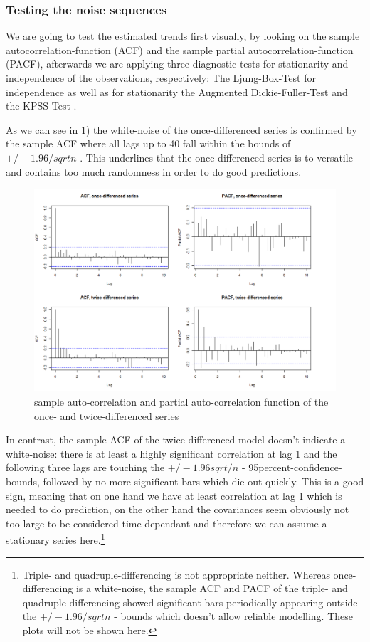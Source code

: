 \documentclass[11pt,a4paper]{article}
\begin{document}
\subsubsection{Testing the noise sequences}

We are going to test the estimated trends first visually, by looking on the sample autocorrelation-function (ACF) and the sample partial autocorrelation-function (PACF), afterwards we are applying three diagnostic tests for stationarity and independence of the observations, respectively:
The Ljung-Box-Test \citep{LjungBox78} for independence as well as for stationarity the Augmented Dickie-Fuller-Test \citep{adf} and the KPSS-Test \citep{kpss92}.

As we can see in \cref{fig:diff12_acf_pacf}) the white-noise of the once-differenced series is confirmed by the sample ACF where all lags up to 40 fall within the bounds of $+/-1.96/sqrt{n}$ \cite[p.~39]{bd02}.
This underlines that the once-differenced series is to versatile and contains too much randomness in order to do good predictions.

\begin{figure}
    \centering
    \includegraphics[angle=0,width=1\textwidth]{diff12_acf_pacf}
    \caption{sample auto-correlation and partial auto-correlation function of the once- and twice-differenced series}
    \label{fig:diff12_acf_pacf}
\end{figure}

In contrast, the sample ACF of the twice-differenced model doesn't indicate a white-noise: there is at least a highly significant correlation at lag 1 and the following three lags are touching the $+/-1.96sqrt/{n}$ - 95percent-confidence-bounds, followed by no more significant bars which die out quickly.
This is a good sign, meaning that on one hand we have at least correlation at lag 1 which is needed to do prediction, on the other hand the covariances seem obviously not too large to be considered time-dependant and therefore we can assume a stationary series here.\footnote{
    Triple- and quadruple-differencing is not appropriate neither.
    Whereas once-differencing is a white-noise, the sample ACF and PACF of the triple- and quadruple-differencing showed significant bars periodically appearing outside the $+/-1.96/sqrt{n}$ - bounds which doesn't allow reliable modelling.
    These plots will not be shown here.
}
\end{document}
